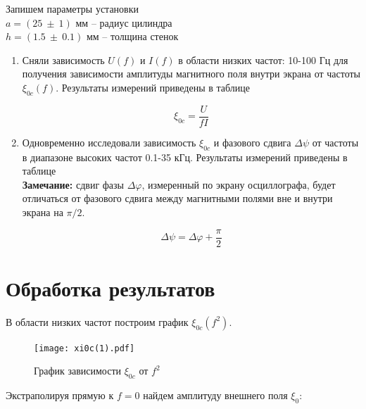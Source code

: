     \begin{center}
        Запишем параметры установки \\
        $a = (25 ~ \pm ~ 1)$ мм -- радиус цилиндра \\
        $h = (1.5 ~ \pm ~ 0.1)$ мм -- толщина стенок
    \end{center}

    \begin{enumerate}
        \item Сняли зависимость $U(f)$ и $I(f)$ в области низких частот: 10-100 Гц для получения зависимости
        амплитуды магнитного поля внутри экрана от частоты $\xi_{0c}(f)$. Результаты измерений приведены в таблице %

        \begin{equation}
            \xi_{0c} = \frac{U}{f I}
        \end{equation}

        \item Одновременно исследовали зависимость $\xi_{0c}$ и фазового сдвига $\Delta \psi$ от частоты в диапазоне высоких частот
        0.1-35 кГц. Результаты измерений приведены в таблице %
        \\

        \textbf{Замечание:} сдвиг фазы $\Delta \varphi$, измеренный по экрану осциллографа, будет отличаться от
        фазового сдвига между магнитными полями вне и внутри экрана на $\pi/2$.

        \[ \Delta \psi = \Delta \varphi + \frac{\pi}{2} \]
    \end{enumerate}

    

    

    \section*{Обработка результатов}

    В области низких частот построим график $\xi_{0c}(f^2)$.

    \begin{figure}[h!]
        \centering
        \texttt{[image: xi0c(1).pdf]}
        \caption{График зависимости $\xi_{0c}$ от $f^2$}
        \label{xi0c(1)}
    \end{figure}

    Экстраполируя прямую к $f = 0$ найдем амплитуду внешнего поля $\xi_0$:

